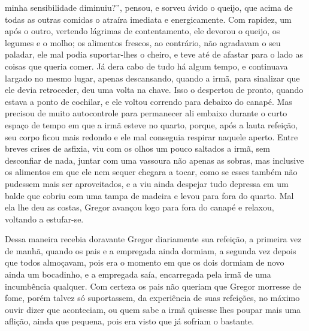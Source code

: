 minha sensibilidade diminuiu?”, pensou, e sorveu ávido o queijo, que acima
de todas as outras comidas o atraíra imediata e energicamente. Com
rapidez, um após o outro, vertendo lágrimas de contentamento, ele devorou
o queijo, os legumes e o molho; os alimentos frescos, ao contrário, não
agradavam o seu paladar, ele mal podia suportar-lhes o cheiro, e teve até
de afastar para o lado as coisas que queria comer. Já dera cabo de tudo há
algum tempo, e continuava largado no mesmo lugar, apenas descansando,
quando a irmã, para sinalizar que ele devia retroceder, deu uma volta na
chave. Isso o despertou de pronto, quando estava a ponto de cochilar, e
ele voltou correndo para debaixo do canapé. Mas precisou de muito
autocontrole para permanecer ali embaixo durante o curto espaço de tempo
em que a irmã esteve no quarto, porque, após a lauta refeição, seu corpo
ficou mais redondo e ele mal conseguia respirar naquele aperto. Entre
breves crises de asfixia, viu com os olhos um pouco saltados a irmã, sem
desconfiar de nada, juntar com uma vassoura não apenas as sobras, mas
inclusive os alimentos em que ele nem sequer chegara a tocar, como se
esses também não pudessem mais ser aproveitados, e a viu ainda despejar
tudo depressa em um balde que cobriu com uma tampa de madeira e levou para
fora do quarto. Mal ela lhe deu as costas, Gregor avançou logo para fora
do canapé e relaxou, voltando a estufar-se.

Dessa maneira recebia doravante Gregor diariamente sua refeição, a
primeira vez de manhã, quando os pais e a empregada ainda dormiam, a
segunda vez depois que todos almoçavam, pois era o momento em que os dois
dormiam de novo ainda um bocadinho, e a empregada saía, encarregada pela
irmã de uma incumbência qualquer. Com certeza os pais não queriam que
Gregor morresse de fome, porém talvez só suportassem, da experiência de
suas refeições, no máximo ouvir dizer que aconteciam, ou quem sabe a irmã
quisesse lhes poupar mais uma aflição, ainda que pequena, pois era visto
que já sofriam o bastante.


